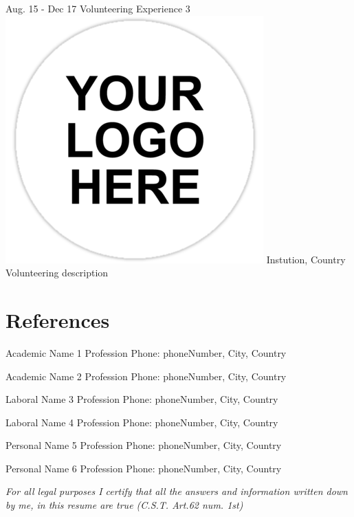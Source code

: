 \documentclass[american]{cv-class}
\begin{document}
\begin{entrylist}
	\entry
	{Aug. 15 - Dec 17}
	{Volunteering Experience 3}
	{{\includegraphics[scale=0.05]{img/generic-logo.png}} Instution, Country} 
	{\justifying Volunteering description}

	
\end{entrylist}


\section{References}
\begin{entrylist}
	  
	\entry
	{Academic}
	{Name 1}
	{Profession} 
	{Phone: phoneNumber, City, Country}
	
	\entry
	{Academic}
	{Name 2}
	{Profession} 
	{Phone: phoneNumber, City, Country}
	
	\entry
	{Laboral}
	{Name 3}
	{Profession} 
	{Phone: phoneNumber, City, Country}
	
	\entry
	{Laboral}
	{Name 4}
	{Profession} 
	{Phone: phoneNumber, City, Country}
	
	\entry
	{Personal}
	{Name 5}
	{Profession} 
	{Phone: phoneNumber, City, Country}
	
	\entry
	{Personal}
	{Name 6}
	{Profession} 
	{Phone: phoneNumber, City, Country}
	
\end{entrylist}

\vspace{0.5cm}
\begin{center}
	\emph{For all legal purposes I certify that all
		the answers and information written down by me,
		in this resume are true (C.S.T.
	Art.62 num. 1st)}
\end{center}
\end{document}
